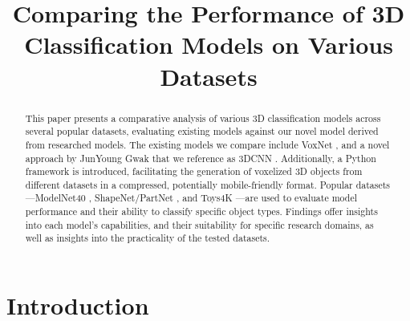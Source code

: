 \documentclass[conference]{IEEEtran}
\begin{document}
\title{Comparing the Performance of 3D Classification Models on Various Datasets\\}

\author{
\and
{}
}

\maketitle


\begin{abstract}
This paper presents a comparative analysis of various 3D classification models across several popular datasets, evaluating existing models against our novel model derived from researched models. The existing models we compare include VoxNet \cite{7353481}, and a novel approach by JunYoung Gwak that we reference as 3DCNN \cite{gwak20153d}. Additionally, a Python framework is introduced, facilitating the generation of voxelized 3D objects from different datasets in a compressed, potentially mobile-friendly format. Popular datasets—ModelNet40 \cite{7298801}, ShapeNet/PartNet \cite{shapenet2015}\cite{qi2017pointnetplusplus}, and Toys4K \cite{stojanov2021using}—are used to evaluate model performance and their ability to classify specific object types. Findings offer insights into each model's capabilities, and their suitability for specific research domains, as well as insights into the practicality of the tested datasets.
\end{abstract}


\section{Introduction}
\end{document}
